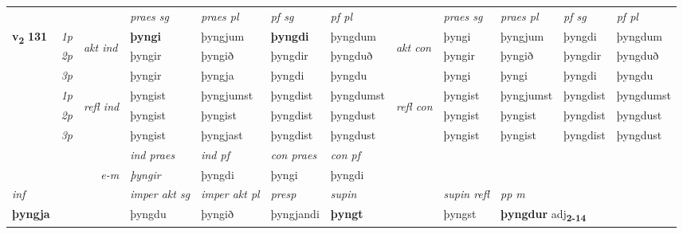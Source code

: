 \begin{longtable}[l]{X>{\footnotesize\itshape}llXXXXlXXXX}
 & &   & \textit{praes sg}  & \textit{praes pl}    & \textit{ pf sg} & \textit{pf pl} & & \textit{praes sg}  & \textit{praes pl}    & \textit{pf sg} & \textit{pf pl }  \\ \cmidrule{4-7} \cmidrule{9-12}
 \multirow{2}{*}{{{\textbf{v{\textsubscript{2}}} \Large{\textbf{131}}}}}  & 1p & \multirow{3}{*}{\begin{turn}{90}\textit{akt ind}\end{turn}} & \textbf{þyngi} & þyngjum & \textbf{þyngdi} & þyngdum & \multirow{3}{*}{\begin{turn}{90}\textit{akt con}\end{turn}} &þyngi & þyngjum & þyngdi & þyngdum\\*
 & 2p &  &  þyngir  & þyngið & þyngdir & þyngduð & & þyngir & þyngið & þyngdir & þyngduð \\*
 & 3p &  & þyngir & þyngja & þyngdi & þyngdu & & þyngi & þyngi& þyngdi & þyngdu \\*
\cmidrule{4-7} \cmidrule{9-12}
 & 1p & \multirow{3}{*}{\begin{turn}{90}\textit{refl ind}\end{turn}}  & þyngist & þyngjumst & þyngdist & þyngdumst & \multirow{3}{*}{\begin{turn}{90}\textit{refl con}\end{turn}}  &þyngist & þyngjumst & þyngdist & þyngdumst \\*
 & 2p &  & þyngist & þyngist & þyngdist & þyngdust & &þyngist & þyngist & þyngdist & þyngdust \\*
 & 3p  & & þyngist & þyngjast & þyngdist & þyngdust & & þyngist & þyngist& þyngdist & þyngdust \\*
\cmidrule{4-7} \cmidrule{9-12}

   && &  \textit{ind praes} & \textit{ind pf} & \textit{con praes} & \textit{con pf} \\*
\multicolumn{3}{r}{\textit{e-m}} & þyngir & þyngdi & þyngi & þyngdi \\*

\cmidrule{4-7}
   {\textit{inf}} & &  & \textit{imper akt sg} & \textit{imper akt pl}   & \textit{presp} & \textit{supin} && \textit{supin refl} & \textit{pp m} \\*
  {\textbf{þyngja}} & && þyngdu  & þyngið   & þyngjandi &  \textbf{þyngt} && þyngst & \multicolumn{2}{l}{\textbf{þyngdur} adj\textbf{\textsubscript{2-14}}} \\*

\midrule


\end{longtable}

